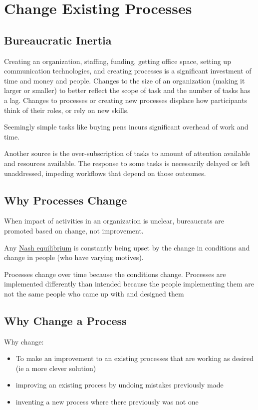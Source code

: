 \section{Change Existing Processes\label{sec:change_a_process}}

\subsection*{Bureaucratic Inertia}

Creating an organization, staffing, funding, getting office space, setting up communication technologies, and creating processes is a significant investment of time and money and people. Changes to the size of an organization (making it larger or smaller) to better reflect the scope of task and the number of tasks has a lag. Changes to processes or creating new processes displace how participants think of their roles, or rely on new skills. 

Seemingly simple tasks like buying pens incurs significant overhead of work and time. 

Another source is the over-subscription of tasks to amount of attention available and resources available. The response to some tasks is necessarily delayed or left unaddressed, impeding workflows that depend on those outcomes. 



\subsection*{Why Processes Change}


When impact of activities in an organization is unclear, bureaucrats are promoted based on change, not improvement.

Any \href{https://en.wikipedia.org/wiki/Nash_equilibrium}{Nash equilibrium} is constantly being upset by the change in conditions and change in people (who have varying motives).

Processes change over time because the conditions change. Processes are implemented differently than intended because the people implementing them are not the same people who came up with and designed them


\subsection*{Why Change a Process}
Why change:
\begin{itemize}
    \item To make an improvement to an existing processes that are working as desired (ie a more clever solution)
    \item improving an existing process by undoing mistakes previously made
    \item inventing a new process where there previously was not one
\end{itemize}

